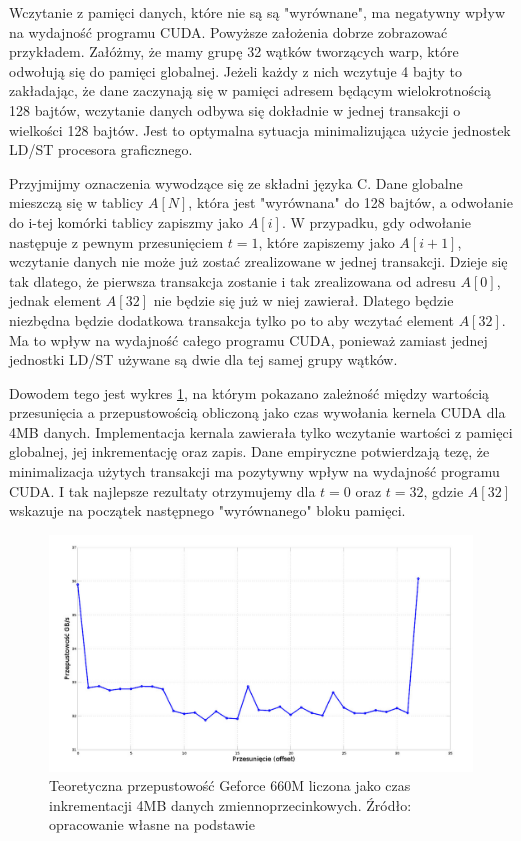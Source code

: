 Wczytanie z pamięci danych, które nie są są "wyrównane", ma negatywny wpływ na
wydajność programu CUDA.  Powyższe założenia dobrze zobrazować przykładem.
Załóżmy, że mamy grupę 32 wątków tworzących warp, które odwołują się do pamięci
globalnej. Jeżeli każdy z nich wczytuje 4 bajty to zakładając, że dane
zaczynają się w pamięci adresem będącym wielokrotnością 128 bajtów, wczytanie
danych odbywa się dokładnie w jednej transakcji o wielkości 128 bajtów. Jest to
optymalna sytuacja minimalizująca użycie jednostek LD/ST procesora graficznego.

Przyjmijmy oznaczenia wywodzące się ze składni języka C. Dane globalne mieszczą się w
tablicy $A[N]$, która jest "wyrównana" do 128 bajtów, a odwołanie do
i-tej komórki tablicy zapiszmy jako $A[i]$. W przypadku, gdy odwołanie następuje
z pewnym przesunięciem $t = 1$, które zapiszemy jako $A[i + 1]$, wczytanie danych
nie może już zostać zrealizowane w jednej transakcji. Dzieje się tak dlatego, że
pierwsza transakcja zostanie i tak zrealizowana od adresu $A[0]$, jednak element
$A[32]$ nie będzie się już w niej zawierał. Dlatego będzie niezbędna będzie
dodatkowa transakcja tylko po to aby wczytać element $A[32]$. Ma to wpływ na
wydajność całego programu CUDA, ponieważ zamiast jednej jednostki LD/ST używane
są dwie dla tej samej grupy wątków. 

Dowodem tego jest wykres \ref{hier2}, na którym pokazano
zależność między wartością przesunięcia a przepustowością obliczoną jako czas
wywołania kernela CUDA dla 4MB danych. Implementacja kernala zawierała tylko
wczytanie wartości z pamięci globalnej, jej inkrementację oraz zapis.
Dane empiryczne potwierdzają tezę, że minimalizacja użytych transakcji ma
pozytywny wpływ na wydajność programu CUDA. I tak najlepsze rezultaty
otrzymujemy dla $t = 0$ oraz $t = 32$, gdzie $A[32]$ wskazuje na początek 
następnego "wyrównanego" bloku pamięci.

\begin{figure}[H]
\centering
\includegraphics[scale=0.4]{images/gf660_offset.png}
\caption{Teoretyczna przepustowość Geforce 660M liczona jako czas inkrementacji
	4MB danych zmiennoprzecinkowych. Źródło: opracowanie własne na
	podstawie \cite{memperf}}
\label{hier2}
\end{figure}

